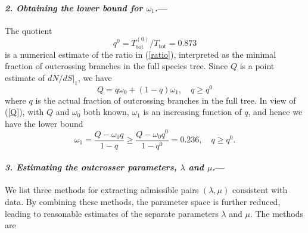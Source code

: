 \documentclass[a4paper,11pt]{article}
\theoremstyle{plain}
\theoremstyle{definition}
\numberwithin{equation}{section}
\begin{document}
\paragraph{\textit{2. Obtaining the lower bound for $\omega_1$.}---}
The quotient
\[
q^0=T^{(0)}_\mathrm{tot}/T_\mathrm{tot}=0.873
\]
is a numerical estimate of the ratio in (\ref{ratio}), interpreted as the
minimal fraction of outcrossing branches in the full species tree.  
Since $Q$ is a point estimate of $dN/dS|_1$, we have
\begin{equation}\label{Q}
Q=q \omega_0+(1-q)\omega_1,\quad q\ge q^0
\end{equation}
where $q$ is the actual fraction of outcrossing branches in the full
tree. In view of (\ref{Q}), with $Q$ and  $\omega_0$
both known,  $\omega_1$ is an increasing function of $q$, and hence
we have the lower bound
\begin{equation}  \label{om1bound}
\omega_1=\frac{Q-\omega_0 q}{1-q}\ge 
\frac{Q-\omega_0 q^0}{1-q^0}= 0.236,\quad q\ge q^0.
\end{equation}





\paragraph{\textit{3. Estimating the outcrosser parameters, $\lambda$ and $\mu$.}---}
We list three methods for extracting admissible pairs
$(\lambda,\mu)$ consistent with data. By combining
these methods, the parameter space is further reduced, 
leading to reasonable estimates of the separate parameters $\lambda$
and $\mu$. The methods are
\end{document}

